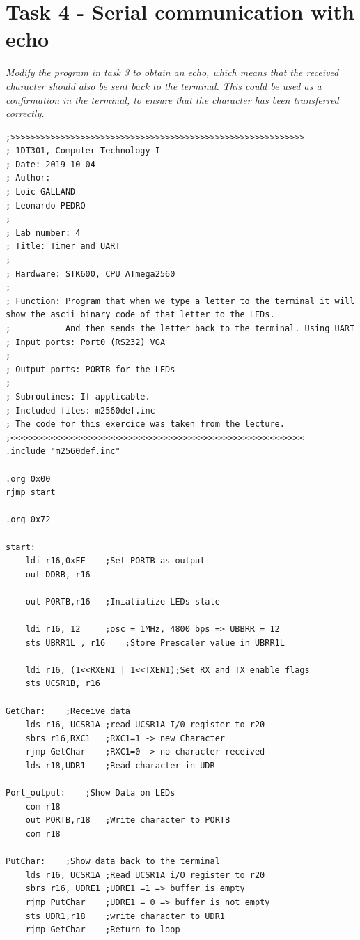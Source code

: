 \documentclass[a4paper,12pt]{article}
\begin{document}
\newpage
\section{Task 4 - Serial communication with echo}
\textit{Modify the program in task 3 to obtain an echo, which means that the received character should
also be sent back to the terminal. This could be used as a confirmation in the terminal, to ensure
that the character has been transferred correctly.}

\lstset{style=Asm}
\begin{lstlisting}
;>>>>>>>>>>>>>>>>>>>>>>>>>>>>>>>>>>>>>>>>>>>>>>>>>>>>>>>>>>>
; 1DT301, Computer Technology I
; Date: 2019-10-04
; Author:
; Loic GALLAND
; Leonardo PEDRO
;
; Lab number: 4
; Title: Timer and UART
;
; Hardware: STK600, CPU ATmega2560
;
; Function: Program that when we type a letter to the terminal it will show the ascii binary code of that letter to the LEDs.
;			And then sends the letter back to the terminal. Using UART
; Input ports: Port0 (RS232) VGA 
;
; Output ports: PORTB for the LEDs 
;
; Subroutines: If applicable.
; Included files: m2560def.inc
; The code for this exercice was taken from the lecture.
;<<<<<<<<<<<<<<<<<<<<<<<<<<<<<<<<<<<<<<<<<<<<<<<<<<<<<<<<<<<
.include "m2560def.inc"

.org 0x00
rjmp start

.org 0x72

start:
	ldi r16,0xFF	;Set PORTB as output
	out DDRB, r16
	
	out PORTB,r16	;Iniatialize LEDs state

	ldi r16, 12		;osc = 1MHz, 4800 bps => UBBRR = 12
	sts UBRR1L , r16	;Store Prescaler value in UBRR1L

	ldi r16, (1<<RXEN1 | 1<<TXEN1);Set RX and TX enable flags 
	sts UCSR1B, r16

GetChar:	;Receive data
	lds r16, UCSR1A	;read UCSR1A I/0 register to r20
	sbrs r16,RXC1	;RXC1=1 -> new Character
	rjmp GetChar	;RXC1=0 -> no character received
	lds r18,UDR1	;Read character in UDR

Port_output:	;Show Data on LEDs
	com r18
	out PORTB,r18	;Write character to PORTB 
	com r18

PutChar:	;Show data back to the terminal
	lds r16, UCSR1A	;Read UCSR1A i/O register to r20
	sbrs r16, UDRE1	;UDRE1 =1 => buffer is empty 
	rjmp PutChar	;UDRE1 = 0 => buffer is not empty
	sts UDR1,r18	;write character to UDR1
	rjmp GetChar	;Return to loop
\end{lstlisting}
\end{document}
